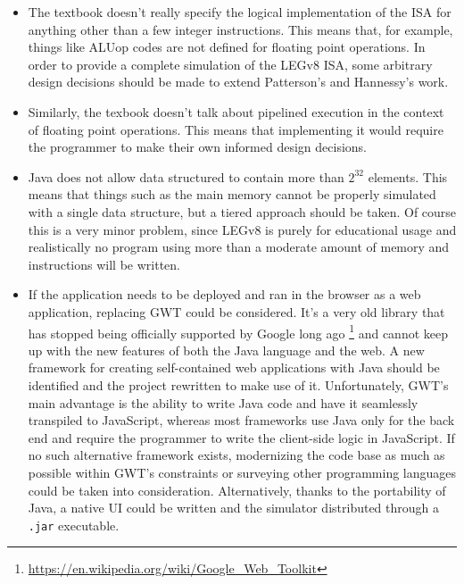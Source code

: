 \begin{itemize}
 	\item The textbook doesn't really specify the logical implementation of the ISA for anything other than a few integer instructions. This means that, for example, things like ALUop codes are not defined for floating point operations. In order to provide a complete simulation of the LEGv8 ISA, some arbitrary design decisions should be made to extend Patterson's and Hannessy's work.
 	\item Similarly, the texbook doesn't talk about pipelined execution in the context of floating point operations. This means that implementing it would require the programmer to make their own informed design decisions.
 	\item Java does not allow data structured to contain more than $2^{32}$ elements. This means that things such as the main memory cannot be properly simulated with a single data structure, but a tiered approach should be taken. Of course this is a very minor problem, since LEGv8 is purely for educational usage and realistically no program using more than a moderate amount of memory and instructions will be written.
 	\item If the application needs to be deployed and ran in the browser as a web application, replacing GWT could be considered. It's a very old library that has stopped being officially supported by Google long ago \footnote{\url{https://en.wikipedia.org/wiki/Google_Web_Toolkit}} and cannot keep up with the new features of both the Java language and the web. A new framework for creating self-contained web applications with Java should be identified and the project rewritten to make use of it. Unfortunately, GWT's main advantage is the ability to write Java code and have it seamlessly transpiled to JavaScript, whereas most frameworks use Java only for the back end and require the programmer to write the client-side logic in JavaScript. If no such alternative framework exists, modernizing the code base as much as possible within GWT's constraints or surveying other programming languages  could be taken into consideration. Alternatively, thanks to the portability of Java, a native UI could be written and the simulator distributed through a \verb|.jar| executable.
\end{itemize}
